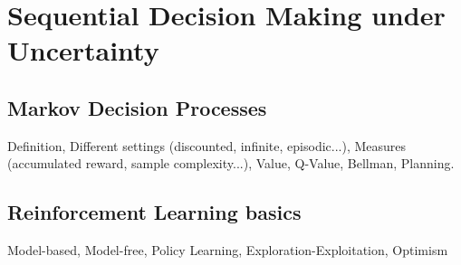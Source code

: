 
\chapter{Sequential Decision Making under Uncertainty}

\label{chapter2}




\section{Markov Decision Processes}

Definition, Different settings (discounted, infinite, episodic...), Measures (accumulated reward, sample complexity...), Value, Q-Value, Bellman, Planning.

\section{Reinforcement Learning basics}

Model-based, Model-free, Policy Learning, Exploration-Exploitation, Optimism
